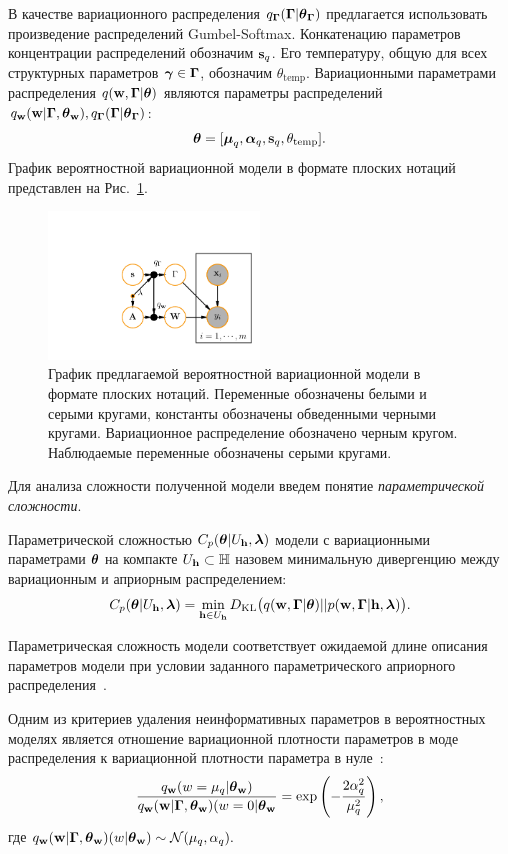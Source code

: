 В качестве вариационного распределения $q_{\boldsymbol{\Gamma}}(\boldsymbol{\Gamma}|\boldsymbol{\theta}_{\boldsymbol{\Gamma}})$ предлагается использовать произведение распределений Gumbel-Softmax. Конкатенацию параметров концентрации распределений обозначим $\mathbf{s}_q$. Его температуру, общую для всех структурных параметров $\boldsymbol{\gamma} \in \boldsymbol{\Gamma}$, обозначим $\theta_\text{temp}$.
Вариационными параметрами распределения $q(\mathbf{w}, \boldsymbol{\Gamma}|\boldsymbol{\theta})$ являются параметры распределений $q_\mathbf{w}(\mathbf{w}| \boldsymbol{\Gamma}, \boldsymbol{\theta}_\mathbf{w}), q_{\boldsymbol{\Gamma}}(\boldsymbol{\Gamma}|\boldsymbol{\theta}_{\boldsymbol{\Gamma}})$:
\[\boldsymbol{\theta} =[\boldsymbol{\mu}_q, \boldsymbol{\alpha}_q,\mathbf{s}_q, \theta_\text{temp}]. 
\]
График вероятностной вариационной модели в формате плоских нотаций представлен на Рис.~\ref{fig:plate_qprob}.
\begin{figure}
\centering
   \includegraphics[width=0.5\textwidth]{plots/notebooks/plate.pdf}
\caption{График предлагаемой вероятностной вариационной модели в формате плоских нотаций. Переменные обозначены белыми и серыми кругами, константы обозначены обведенными черными кругами. Вариационное распределение обозначено черным кругом. Наблюдаемые переменные обозначены серыми кругами.}
\label{fig:plate_qprob}
\end{figure}

Для анализа сложности полученной модели введем понятие \textit{параметрической сложности}. 
\begin{defin} 
Параметрической сложностью  $C_p(\boldsymbol{\theta}|U_{\mathbf{h}}, \boldsymbol{\lambda})$ модели с вариационными параметрами $\boldsymbol{\theta}$ на компакте $U_{\mathbf{h}} \subset \mathbb{H}$ назовем минимальную дивергенцию между вариационным и априорным распределением:
\[
C_p(\boldsymbol{\theta}|U_{\mathbf{h}}, \boldsymbol{\lambda}) = \min_{\mathbf{h} \in U_{\mathbf{h}}} D_\text{KL}\bigl(q(\mathbf{w}, \boldsymbol{\Gamma}|\boldsymbol{\theta}) || p(\mathbf{w}, \boldsymbol{\Gamma}|\mathbf{h},\boldsymbol{\lambda})\bigr).
\]
\end{defin}
Параметрическая сложность модели соответствует ожидаемой длине описания параметров модели при условии заданного параметрического априорного распределения~\cite{hinton_mdl}.

Одним из критериев удаления неинформативных параметров в вероятностных моделях является отношение вариационной плотности параметров в моде распределения к вариационной плотности параметра в нуле~\cite{nips}:
\[\frac{q_{\mathbf{w}}(w=\mu_q|\boldsymbol{\theta}_\mathbf{w})}{q_\mathbf{w}(\mathbf{w}| \boldsymbol{\Gamma}, \boldsymbol{\theta}_\mathbf{w})(w=0|\boldsymbol{\theta}_\mathbf{w}}= \text{exp}\left(-\frac{2\alpha_q^2}{\mu_q^2}\right),
\]
где $q_\mathbf{w}(\mathbf{w}| \boldsymbol{\Gamma}, \boldsymbol{\theta}_\mathbf{w})(w|\boldsymbol{\theta}_\mathbf{w}) \sim \mathcal{N}(\mu_q, \alpha_q).$

